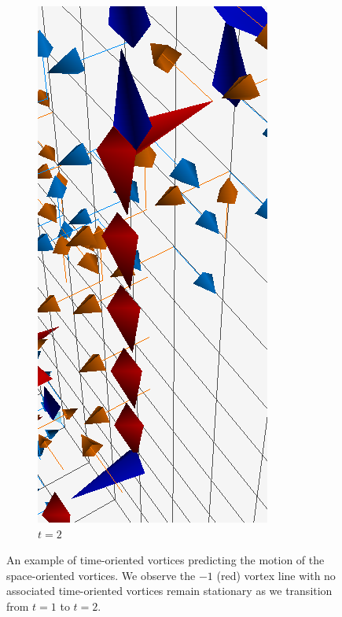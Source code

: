 \begin{figure}[H]
\begin{subfigure}[b]{0.45\textwidth}
\includegraphics[height=0.3\textheight]{./plaqlinet2_line&monopole.png}
\caption{\label{fig:VortexMotion2}$t=2$}
\end{subfigure}
\caption[An example of time-oriented vortices predicting the motion of the space-oriented vortices.]{\label{fig:VortexMotion}An example of time-oriented vortices predicting the motion of the space-oriented vortices. We observe the $-1$ (red) vortex line with no associated time-oriented vortices remain stationary as we transition from $t=1$ to $t=2$.}
\end{figure}
%

